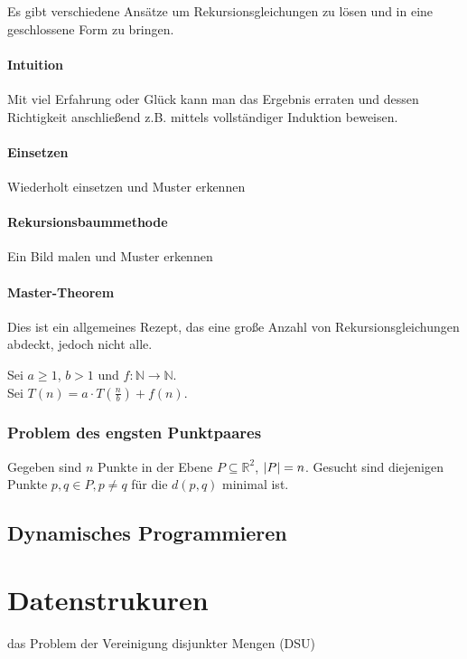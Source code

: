 Es gibt verschiedene Ansätze um Rekursionsgleichungen zu lösen und in eine geschlossene Form zu bringen.

\paragraph{Intuition}
Mit viel Erfahrung oder Glück kann man das Ergebnis erraten und dessen
Richtigkeit anschließend z.B. mittels vollständiger Induktion beweisen.

\paragraph{Einsetzen} Wiederholt einsetzen und Muster erkennen

\paragraph{Rekursionsbaummethode} Ein Bild malen und Muster erkennen

\paragraph{Master-Theorem}
Dies ist ein allgemeines Rezept, das eine große Anzahl von Rekursionsgleichungen
abdeckt, jedoch nicht alle.

Sei $a \geq 1$, $b > 1$ und $f: \mathbb{N} \rightarrow \mathbb{N}$.\\
Sei $T(n) = a \cdot T(\frac{n}{b}) + f(n)$.

\subsubsection{Problem des engsten Punktpaares}

Gegeben sind $n$ Punkte in der Ebene $P \subseteq \mathbb{R}^2$, $\left|P\right| = n$.
Gesucht sind diejenigen Punkte $p, q \in P, p \neq q$ für die $d(p, q)$ minimal ist.

\subsection{Dynamisches Programmieren}



\section{Datenstrukuren}

das Problem der Vereinigung disjunkter Mengen (DSU)

